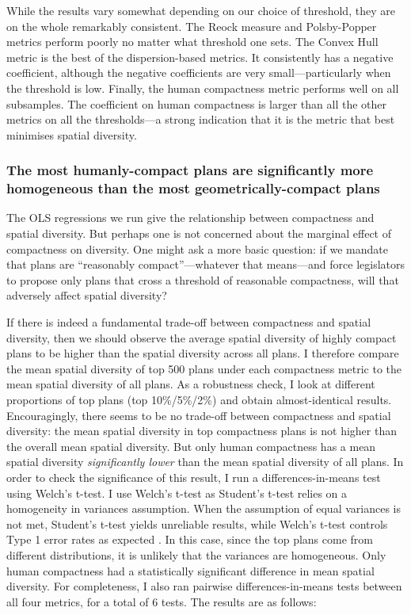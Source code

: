 \documentclass[]{article}
\begin{document}
While the results vary somewhat depending on our choice of threshold,
they are on the whole remarkably consistent. The Reock measure and
Polsby-Popper metrics perform poorly no matter what threshold one sets.
The Convex Hull metric is the best of the dispersion-based metrics. It
consistently has a negative coefficient, although the negative
coefficients are very small---particularly when the threshold is low.
Finally, the human compactness metric performs well on all subsamples.
The coefficient on human compactness is larger than all the other
metrics on all the thresholds---a strong indication that it is the
metric that best minimises spatial diversity.

\hypertarget{the-most-humanly-compact-plans-are-significantly-more-homogeneous-than-the-most-geometrically-compact-plans}{%
\subsubsection{The most humanly-compact plans are significantly more
homogeneous than the most geometrically-compact
plans}\label{the-most-humanly-compact-plans-are-significantly-more-homogeneous-than-the-most-geometrically-compact-plans}}

The OLS regressions we run give the relationship between compactness and
spatial diversity. But perhaps one is not concerned about the marginal
effect of compactness on diversity. One might ask a more basic question:
if we mandate that plans are ``reasonably compact''---whatever that
means---and force legislators to propose only plans that cross a
threshold of reasonable compactness, will that adversely affect spatial
diversity?

If there is indeed a fundamental trade-off between compactness and
spatial diversity, then we should observe the average spatial diversity
of highly compact plans to be higher than the spatial diversity across
all plans. I therefore compare the mean spatial diversity of top 500
plans under each compactness metric to the mean spatial diversity of all
plans. As a robustness check, I look at different proportions of top
plans (top 10\%/5\%/2\%) and obtain almost-identical results.
Encouragingly, there seems to be no trade-off between compactness and
spatial diversity: the mean spatial diversity in top compactness plans
is not higher than the overall mean spatial diversity. But only human
compactness has a mean spatial diversity \emph{significantly lower} than
the mean spatial diversity of all plans. In order to check the
significance of this result, I run a differences-in-means test using
Welch's t-test. I use Welch's t-test as Student's t-test relies on a
homogeneity in variances assumption. When the assumption of equal
variances is not met, Student's t-test yields unreliable results, while
Welch's t-test controls Type 1 error rates as expected
\citep{delacre2017}. In this case, since the top plans come from
different distributions, it is unlikely that the variances are
homogeneous. Only human compactness had a statistically significant
difference in mean spatial diversity. For completeness, I also ran
pairwise differences-in-means tests between all four metrics, for a
total of 6 tests. The results are as follows:
\end{document}
